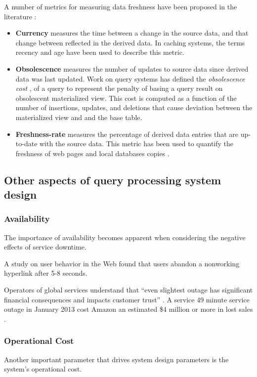A number of metrics for measuring data freshness have been proposed in the literature \cite{bouzeghoub:datafreshness}:
\begin{itemize}
  \item \textbf{Currency} measures the time between a change in the source data, and that change between reflected in
  the derived data.
  In caching systems, the terms recency \cite{bright:latencyrecency} and age \cite{cho:dbfreshness}
  have been used to describe this metric.
  \item \textbf{Obsolescence} measures the number of updates to source data since derived data was last updated.
  Work on query systems has defined the \textit{obsolescence cost} \cite{avigdor:obsolescent}, of a query to represent
  the penalty of basing a query result on obsolescent materialized view.
  This cost is computed as a function of the number of insertions, updates, and deletions that cause deviation between
  the materialized view and and the base table.
  \item \textbf{Freshness-rate} measures the percentage of derived data entries that are up-to-date with the source
  data.
  This metric has been used to quantify the freshness of web pages \cite{labrinidis:balancingperfomancefreshness} and
  local databases copies \cite{cho:dbfreshness}.
\end{itemize}

\subsection{Other aspects of query processing system design}

\subsubsection{Availability}
The importance of availability becomes apparent when considering the negative effects of service downtime.

A study on user behavior in the Web \cite{nah:waitingtime} found that users abandon a nonworking hyperlink after
5-8 seconds.

Operators of global services understand that ``even slightest outage has significant financial
consequences and impacts customer trust'' \cite{deCandia:dynamo}.
A service 49 minute service outage in January 2013 cost Amazon an estimated \$4 million or more in lost sales
\cite{infoworld:cloudoutages}.

\subsubsection{Operational Cost}
Another important parameter that drives system design parameters is the system's operational cost.

